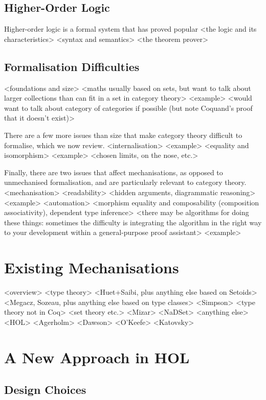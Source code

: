 \documentclass[twoside,titlepage,11pt]{article}
\begin{document}
\subsection{Higher-Order Logic}%
Higher-order logic is a formal system that has proved popular
<the logic and its characteristics>%
<syntax and semantics>%
<the theorem prover>%
\subsection{Formalisation Difficulties}%
<foundations and size>%
  <maths usually based on sets, but want to talk about larger collections than can fit in a set in category theory>
  <example>
  <would want to talk about category of categories if possible (but note Coquand's proof that it doesn't exist)>

There are a few more issues than size that make category theory difficult to formalise, which we now review.
<internalisation>%
  <example>
<equality and isomorphism>%
  <example>
  <chosen limits, on the nose, etc.>

Finally, there are two issues that affect mechanisations, as opposed to unmechanised formalisation, and are particularly relevant to category theory.
<mechanisation>
  <readability>%
    <hidden arguments, diagrammatic reasoning>
    <example>
  <automation>%
    <morphism equality and composability (composition associativity), dependent type inference> 
    <there may be algorithms for doing these things: sometimes the difficulty is integrating the algorithm in the right way to your development within a general-purpose proof assistant>
    <example>
\section{Existing Mechanisations}%
<overview>%
<type theory>%
  <Huet+Saibi, plus anything else based on Setoids>%
  <Megacz, Sozeau, plus anything else based on type classes>%
  <Simpson>%
  <type theory not in Coq>%
<set theory etc.>%
  <Mizar>%
  <NaDSet>%
  <anything else>%
<HOL>%
  <Agerholm>%
  <Dawson>%
  <O'Keefe>%
  <Katovsky>%
\section{A New Approach in HOL}%
\subsection{Design Choices}%
\end{document}
